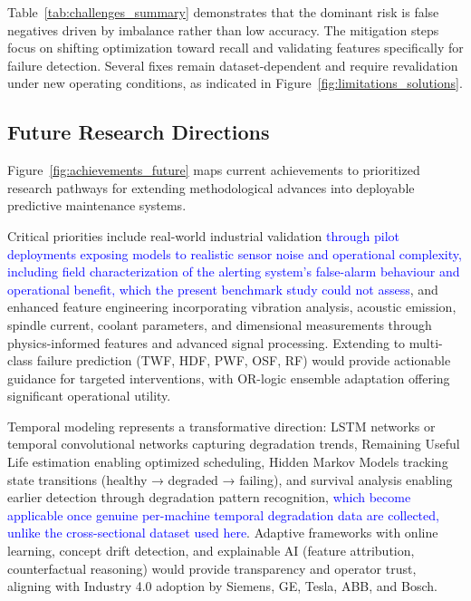 \documentclass[final,5p, twocolumn]{elsarticle}
\begin{document}
Table~\ref{tab:challenges_summary} demonstrates that the dominant risk is false negatives driven by imbalance rather than low accuracy. The mitigation steps focus on shifting optimization toward recall and validating features specifically for failure detection. Several fixes remain dataset-dependent and require revalidation under new operating conditions, as indicated in Figure~\ref{fig:limitations_solutions}.

\subsection{Future Research Directions}\label{sec:future_work}

Figure~\ref{fig:achievements_future} maps current achievements to prioritized research pathways for extending methodological advances into deployable predictive maintenance systems.

Critical priorities include real-world industrial validation \textcolor{blue}{through pilot deployments exposing models to realistic sensor noise and operational complexity, including field characterization of the alerting system's false-alarm behaviour and operational benefit, which the present benchmark study could not assess}, and enhanced feature engineering incorporating vibration analysis, acoustic emission, spindle current, coolant parameters, and dimensional measurements through physics-informed features and advanced signal processing. Extending to multi-class failure prediction (TWF, HDF, PWF, OSF, RF) would provide actionable guidance for targeted interventions, with OR-logic ensemble adaptation offering significant operational utility.

Temporal modeling represents a transformative direction: LSTM networks or temporal convolutional networks capturing degradation trends, Remaining Useful Life estimation enabling optimized scheduling, Hidden Markov Models tracking state transitions (healthy → degraded → failing), and survival analysis enabling earlier detection through degradation pattern recognition,\textcolor{blue}{ which become applicable once genuine per-machine temporal degradation data are collected, unlike the cross-sectional dataset used here}. Adaptive frameworks with online learning, concept drift detection, and explainable AI (feature attribution, counterfactual reasoning) would provide transparency and operator trust, aligning with Industry 4.0 adoption by Siemens, GE, Tesla, ABB, and Bosch.
\end{document}
